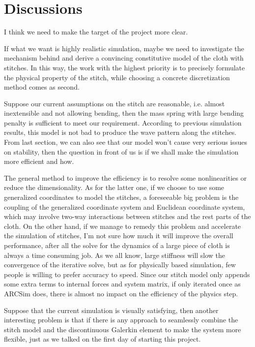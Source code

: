\documentclass[a4paper,10pt]{article}
\begin{document}
\section{Discussions}

I think we need to make the target of the project more clear. 

If what we want is highly realistic simulation, maybe we need to investigate the mechanism behind and derive a convincing constitutive model of the cloth with stitches. 
In this way, the work with the highest priority is to precisely formulate the physical property of the stitch, while choosing a concrete discretization method comes as second.

Suppose our current assumptions on the stitch are reasonable, i.e. almost inextensible and not allowing bending, then the mass spring with large bending penalty is 
sufficient to meet our requirement. According to previous simulation results, this model is not bad to produce the wave pattern along the stitches.
From last section, we can also see that our model won't cause very serious issues on stability, then the question in front of us is if we shall make the simulation more efficient and how.  

The general method to improve the efficiency is to resolve some nonlinearities or reduce the dimensionality. As for the latter one, if we choose to use some generalized coordinates to model the stitches, 
a foreseeable big problem is the coupling of the generalized coordinate system and Euclidean coordinate system, which may involve two-way interactions between stitches and the rest parts of
the cloth. On the other hand, if we manage to remedy this problem and accelerate the simulation of stitches, I'm not sure how much it will improve the overall performance, after all the solve for the dynamics of a large piece of cloth
is always a time consuming job. As we all know, large stiffness will slow the convergence of the iterative solve, but as for physically based simulation, few people is willing to prefer accuracy to speed. 
Since our stitch model only appends some extra terms to internal forces and system matrix, if only iterated once as ARCSim does, there is almost no impact on the efficiency of the physics step.

Suppose that the current simulation is visually satisfying, then another interesting problem is that if there is any approach to seamlessly combine the stitch model and the discontinuous Galerkin element to make the system
more flexible, just as we talked on the first day of starting this project.
\end{document}
